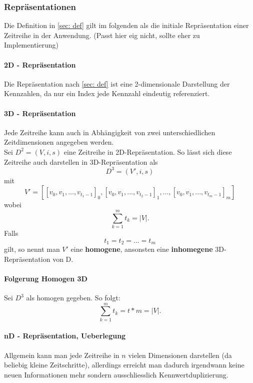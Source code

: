 \documentclass[12pt]{article}
\begin{document}
		\subsubsection{Repräsentationen}
		Die Definition in \ref{sec: def} gilt im folgenden als die initiale Repräsentation einer Zeitreihe in der Anwendung. (Passt hier eig 			nicht, sollte eher zu Implementierung)
		
			\paragraph{2D - Repräsentation}
				Die Repräsentation nach \ref{sec: def} ist eine 2-dimensionale Darstellung der Kennzahlen, da nur ein Index jede Kennzahl 						eindeutig referenziert.
				
			\paragraph{3D - Repräsentation}
				Jede Zeitreihe kann auch in Abhängigkeit von zwei unterschiedlichen Zeitdimensionen angegeben werden. \\[0,3cm]
				Sei $D^{2} = (V, i, s)$ eine Zeitreihe in 2D-Repräsentation. So lässt sich diese Zeitreihe auch darstellen in 3D-Repräsentation als
				\begin{equation}
					D^{3} = (V', i, s)
				\end{equation}
				mit
				\begin{equation}
					V' = [[v_{0}, v_{1}, ..., v_{t_{1} - 1}]_{0},[v_{0}, v_{1}, ..., v_{t_{2} - 1}]_{1},...,[v_{0}, v_{1}, ..., v_{t_{m} - 1}]_{m}]
				\end{equation}
				wobei 
				\begin{equation}
					\sum_{k=1}^{m}t_{k} = |V|.
				\end{equation}
				Falls
				\begin{equation}
					t_{1}=t_{2}=...=t_{m}
				\end{equation}
				gilt, so nennt man $V'$ eine \textbf{homogene}, ansonsten eine \textbf{inhomegene} 3D-Repräsentation von D.
			\paragraph{Folgerung Homogen 3D}
				Sei $D^{3}$ als homogen gegeben. So folgt:
				\begin{equation}
					\sum_{k=1}^{m}t_{k} = t*m = |V|.
				\end{equation}
				
			\paragraph{nD - Repräsentation, Ueberlegung}
				Allgemein kann man jede Zeitreihe in $n$ vielen Dimensionen darstellen (da beliebig kleine Zeitschritte), allerdings erreicht man dadurch irgendwann keine neuen Informationen mehr sondern ausschliesslich Kennwertduplizierung.
\end{document}
